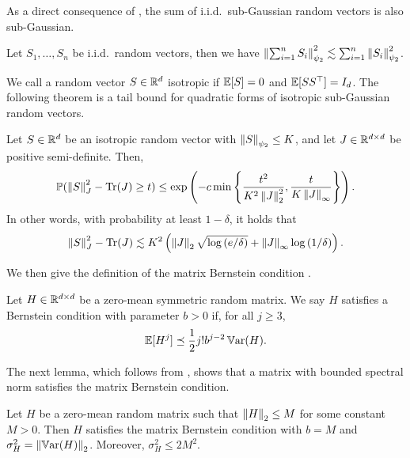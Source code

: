 As a direct consequence of \citet[Prop.~2.6.1]{vershynin2018high}, the sum of i.i.d.~sub-Gaussian random vectors is also sub-Gaussian.
\begin{lemma}\label{lem:sum_subg}
Let $S_1, \dots, S_n$ be i.i.d.~random vectors, then we have $\left\lVert \sum_{i=1}^n S_i \right\rVert_{\psi_2}^2 \lesssim \sum_{i=1}^n \left\lVert S_i \right\rVert_{\psi_2}^2$.
\end{lemma}

We call a random vector $S \in {\mathbb R}^d$ isotropic if $\operatorname{\mathbb E}[S] = 0$ and $\operatorname{\mathbb E}[SS^\top] = I_d$.
The following theorem is a tail bound for quadratic forms of isotropic sub-Gaussian random vectors.
\begin{theorem}\label{thm:isotropic_tail}
Let $S \in {\mathbb R}^d$ be an isotropic random vector with $\left\lVert S \right\rVert_{\psi_2} \le K$, and let $J \in {\mathbb R}^{d \times d}$ be positive semi-definite.
Then,
\begin{align*}
    \operatorname{\mathbb P}(\left\lVert S \right\rVert_{J}^2 - \text{Tr}(J) \ge t) \le \exp\left(-c\min\left\{ \frac{t^2}{K^2 \left\lVert J \right\rVert_2^2}, \frac{t}{K\left\lVert J \right\rVert_\infty} \right\} \right).
\end{align*}
In other words, with probability at least $1 - \delta$, it holds that
\begin{align}
  \left\lVert S \right\rVert_{J}^2 - \text{Tr}(J) \lesssim K^2\left( \left\lVert J \right\rVert_2 \sqrt{\log{(e/\delta)}} + \left\lVert J \right\rVert_{\infty} \log{(1/\delta)} \right).
\end{align}
\end{theorem}

We then give the definition of the matrix Bernstein condition \cite[Chapter 6.4]{wainwright2019high}.

\begin{definition}\label{def:matrix_bernstein}
    Let $H \in {\mathbb R}^{d \times d}$ be a zero-mean symmetric random matrix.
    We say $H$ satisfies a Bernstein condition with parameter $b > 0$ if, for all $j \ge 3$,
    \begin{align*}
        \operatorname{\mathbb E}[H^j] \preceq \frac12 j! b^{j-2} \operatorname{\mathbb{V}ar}(H).
    \end{align*}
\end{definition}

The next lemma, which follows from \citet[Eq.~(6.30)]{wainwright2019high}, shows that a matrix with bounded spectral norm satisfies the matrix Bernstein condition.
\begin{lemma}\label{lem:bounded_bernstein}
    Let $H$ be a zero-mean random matrix such that $\left\lVert H \right\rVert_2 \le M$ for some constant $M > 0$.
    Then $H$ satisfies the matrix Bernstein condition with $b = M$ and $\sigma_H^2 = \left\lVert \operatorname{\mathbb{V}ar}(H) \right\rVert_2$.
    Moreover, $\sigma_H^2 \le 2M^2$.
\end{lemma}

